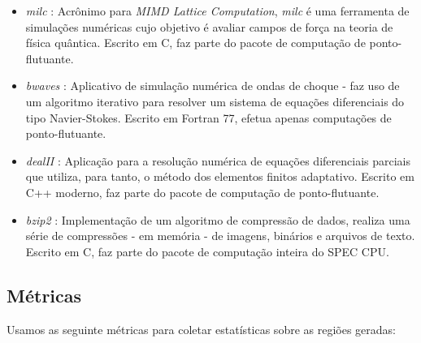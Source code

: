 \documentclass[12pt,twoside]{article}
\begin{document}
\begin{itemize}
\item \emph{milc} \cite{milc-url}: Acrônimo para \emph{MIMD Lattice Computation}, \emph{milc} é uma ferramenta de simulações numéricas cujo objetivo é avaliar campos de força na teoria de física quântica. Escrito em C, faz parte do pacote de computação de ponto-flutuante.

\item \emph{bwaves} \cite{bwaves-url}: Aplicativo de simulação numérica de ondas de choque - faz uso de um algoritmo iterativo para resolver um sistema de equações diferenciais do tipo Navier-Stokes. Escrito em Fortran 77, efetua apenas computações de ponto-flutuante.

\item \emph{dealII} \cite{deal-url}: Aplicação para a resolução numérica de equações diferenciais parciais que utiliza, para tanto, o método dos elementos finitos adaptativo. Escrito em C++ moderno, faz parte do pacote de computação de ponto-flutuante.

\item \emph{bzip2} \cite{bzip-url}: Implementação de um algoritmo de compressão de dados, realiza uma série de compressões - em memória - de imagens, binários e arquivos de texto. Escrito em C, faz parte do pacote de computação inteira do SPEC CPU.
\end{itemize}


\subsection{Métricas}
Usamos as seguinte métricas para coletar estatísticas sobre as regiões geradas:
\end{document}
